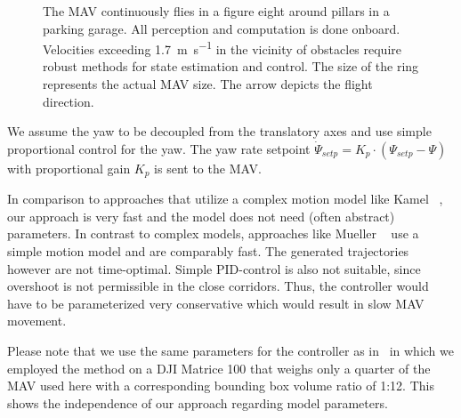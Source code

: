 \begin{figure}
    \centering
    \vspace{-2em}
    \caption{The MAV continuously flies in a figure eight around pillars in a parking garage. All perception and computation is done onboard. Velocities exceeding \SI{1.7}{\meter\per\second} in the vicinity of obstacles require robust methods for state estimation and control. The size of the ring represents the actual MAV size. The arrow depicts the flight direction.}
    \label{fig:trajectory_garage_image}
    \vspace{-1ex}
\end{figure}

We assume the yaw to be decoupled from the translatory axes and use simple proportional control for the yaw. The yaw rate setpoint $\dot\Psi_{setp} = K_{p} \cdot (\Psi_{setp} - \Psi)$ with proportional gain $K_{p}$ is sent to the MAV.

In comparison to approaches that utilize a complex motion model like Kamel \etal~\cite{kamelmpc2016}, our approach is very fast and the model does not need (often abstract) parameters.
In contrast to complex models, approaches like Mueller \etal~\cite{Mueller2013_2} use a simple motion model and are comparably fast. The generated trajectories however are not time-optimal.
Simple PID-control is also not suitable, since overshoot is not permissible in the close corridors. Thus, the controller would have to be parameterized very conservative which would result in slow MAV movement.

Please note that we use the same parameters for the controller as in~\cite{ecmr2017_c1} in which we employed the method on a DJI Matrice 100 that weighs only a quarter of the MAV used here with a corresponding bounding box volume ratio of 1:12. This shows the independence of our approach regarding model parameters.

